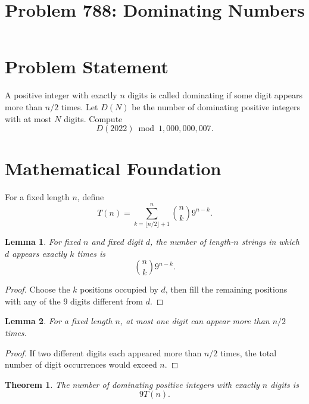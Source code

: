 \documentclass[11pt]{article}
\title{Problem 788: Dominating Numbers}
\author{}
\date{}
\newtheorem{lemma}{Lemma}
\newtheorem{theorem}{Theorem}
\begin{document}
\maketitle

\section{Problem Statement}

A positive integer with exactly $n$ digits is called dominating if some digit appears more than $n/2$ times. Let $D(N)$ be the number of dominating positive integers with at most $N$ digits. Compute
\[
  D(2022) \bmod 1{,}000{,}000{,}007.
\]

\section{Mathematical Foundation}

For a fixed length $n$, define
\[
  T(n) = \sum_{k=\lfloor n/2 \rfloor + 1}^{n} \binom{n}{k} 9^{n-k}.
\]

\begin{lemma}
For fixed $n$ and fixed digit $d$, the number of length-$n$ strings in which $d$ appears exactly $k$ times is
\[
  \binom{n}{k}9^{n-k}.
\]
\end{lemma}

\begin{proof}
Choose the $k$ positions occupied by $d$, then fill the remaining positions with any of the $9$ digits different from $d$.
\end{proof}

\begin{lemma}
For a fixed length $n$, at most one digit can appear more than $n/2$ times.
\end{lemma}

\begin{proof}
If two different digits each appeared more than $n/2$ times, the total number of digit occurrences would exceed $n$.
\end{proof}

\begin{theorem}
The number of dominating positive integers with exactly $n$ digits is
\[
  9T(n).
\]
\end{theorem}
\end{document}
